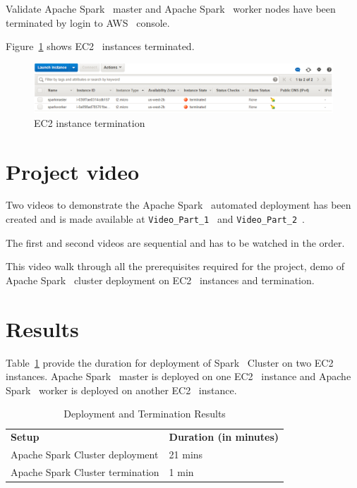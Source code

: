 Validate Apache Spark~\cite{hid-sp18-511-www-spark} master and Apache
Spark~\cite{hid-sp18-511-www-spark} worker nodes have been terminated
by login to AWS~\cite{hid-sp18-511-www-aws} console.

Figure~\ref{f:ec2-instance-terminate} shows
EC2~\cite{hid-sp18-511-www-ec2} instances terminated.

\begin{figure}[!ht]
	\centering\includegraphics[width=\columnwidth]
        {images/ec2instancesterminate.png} \caption{EC2
	instance termination}\label{f:ec2-instance-terminate}
\end{figure}


\section{Project video}

Two videos to demonstrate the Apache
Spark~\cite{hid-sp18-511-www-spark} automated deployment has been
created and is made available
at \verb|Video_Part_1|~\cite{hid-sp18-511-www-video-part-1}
and \verb|Video_Part_2|~\cite{hid-sp18-511-www-video-part-2}.

The first and second videos are sequential and has to be watched in
the order.

This video walk through all the prerequisites required for the
project, demo of Apache Spark~\cite{hid-sp18-511-www-spark} cluster
deployment on EC2~\cite{hid-sp18-511-www-ec2} instances and
termination.

\section{Results}

Table~\ref{t:dep-results-table} provide the duration for deployment
of Spark~\cite{hid-sp18-511-www-spark} Cluster on two
EC2~\cite{hid-sp18-511-www-ec2} instances. Apache
Spark~\cite{hid-sp18-511-www-spark} master is deployed on one
EC2~\cite{hid-sp18-511-www-ec2} instance and Apache
Spark~\cite{hid-sp18-511-www-spark} worker is deployed on another
EC2~\cite{hid-sp18-511-www-ec2} instance.

\begin{table}[htb]
	\centering
	\caption{Deployment and Termination Results}\label{t:dep-results-table}
	\begin{tabular}{ll} 
		\textbf{Setup} & \textbf{Duration (in minutes)} \\ 
		Apache Spark Cluster deployment  & 21 mins \\
		Apache Spark Cluster termination & 1 min \\
	\end{tabular}
\end{table}

